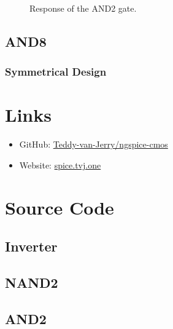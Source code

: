 \documentclass{scrartcl}
\newcommand{\includeres}[1]{\sffamily\scriptsize}
\begin{document}
      \begin{figure}[htbp]
        \includeres{and2}
        \caption{Response of the AND2 gate.}
      \end{figure}

    \subsection{AND8}

      \subsubsection{Symmetrical Design}

  \appendix

  \section{Links}
    \begin{itemize}
      \item GitHub: \href{https://github.com/Teddy-van-Jerry/ngspice-cmos}{Teddy-van-Jerry/ngspice-cmos}
      \item Website: \href{https://spice.tvj.one}{spice.tvj.one}
    \end{itemize}

  \section{Source Code}

    \subsection{Inverter}
      
      

    \subsection{NAND2}
      
      

    \subsection{AND2}
      
      
\end{document}
